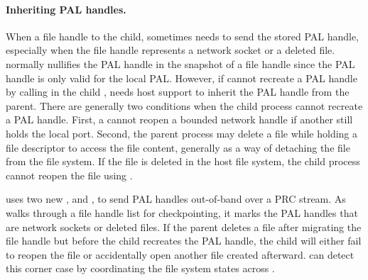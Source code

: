 

\begin{comment}
A critical challenge in developing a Linux library OS was implementing 
handle inheritance in the guest.  In some cases, 
handles are easy to reproduce: an open file can simply be reopened in the child,
and the cursor offset adjusted (note that file handle offsets are a library abstraction
implemented over a memory mapped file).
Pipes, however, are not easily recreated without host support.
\end{comment}

\paragraph{Inheriting PAL handles.}
When a file handle to the child, \thelibos{} sometimes needs to send the stored PAL handle, especially when the file handle
represents a network socket or a deleted file.
\thelibos{} normally nullifies the PAL handle in the snapshot of a file handle
since the PAL handle is only valid for the local PAL.
However, if \thelibos{} cannot recreate a PAL handle by calling  in the child \picoproc{}, \thelibos{} needs host support to inherit
the PAL handle from the parent.
There are generally two conditions when the child process
cannot recreate a PAL handle.
First, a \picoproc{} cannot reopen a bounded network handle
if another \picoproc{} still holds the local port.
Second, the parent process may delete a file while holding a file descriptor to access the file content, generally as a way of detaching the file from the file system.
If the file is deleted in the host file system,
the child process cannot reopen the file
using .



\thelibos{} uses two new \hostapis{},
 and , to send PAL handles out-of-band over a PRC stream.
As \thelibos{} walks through a file handle list for checkpointing, it marks the PAL handles that are network sockets or deleted files.
If the parent deletes a file after migrating the file handle but before the child recreates the PAL handle,
the child will either fail to reopen the file
or accidentally open another file created afterward.
\thelibos{} can detect this corner case by coordinating the file system states
across \picoprocs{}.



